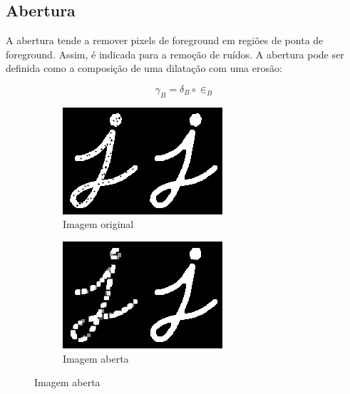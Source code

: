 \documentclass[10pt,a4paper]{article}
\begin{document}
\subsection{Abertura}
A abertura tende a remover pixels de foreground em regiões de ponta de foreground. Assim, é indicada para a remoção de ruídos. A abertura pode ser definida como a composição de uma dilatação com uma erosão:

\begin{equation}
    \gamma_B = \delta_B \circ \in_B
\end{equation}

\begin{figure}[!ht]
    \centering
    \begin{subfigure}[ht]{0.45\textwidth}
        \includegraphics[width=\textwidth]{src.jpg}
        \caption{Imagem original}
    \end{subfigure}
    \qquad
    \begin{subfigure}[ht]{0.45\textwidth}
        \includegraphics[width=\textwidth]{opening.jpg}
        \caption{Imagem aberta}
    \end{subfigure}
    \label{fig:opening}
\end{figure}
\end{document}
